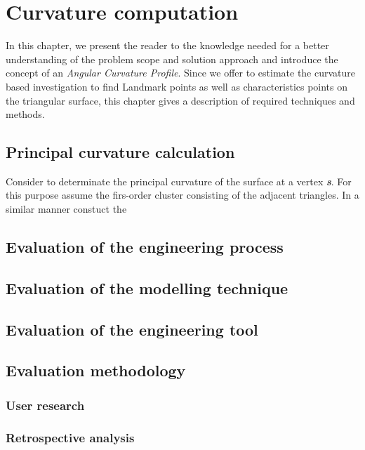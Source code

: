 

\chapter{Curvature computation}\label{chapter:curvature_computation}

In this chapter, we present the reader to the knowledge needed for a better understanding of the problem scope and solution approach and introduce the concept of an \textit{Angular Curvature Profile}. Since we offer to estimate the curvature based investigation to find Landmark points as well as characteristics points on the triangular surface, this chapter gives a description of required techniques and methods. 

\section{Principal curvature calculation }\label{section:princip_curvature}

Consider to determinate the principal curvature of the surface at a vertex \textbf{\textit{s}}. For this purpose assume the firs-order cluster consisting of the adjacent triangles. In a similar manner constuct the  



\section{Evaluation of the engineering process}\label{section:eval_e_p}



\section{Evaluation of the modelling technique}\label{section:eval_m_t}

\section{Evaluation of the engineering tool}\label{section:eval_p_t}
\section{Evaluation methodology}\label{section:eval_methodology}
\subsection{User research}\label{subsection:user_study}
\subsection{Retrospective analysis}\label{subsection:retrospective}
